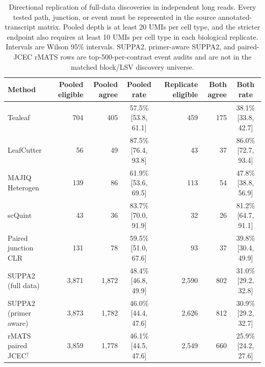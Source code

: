 \documentclass[11pt]{article}
\begin{document}
\begin{table}[H]
\centering
\scriptsize
\setlength{\tabcolsep}{3pt}
\caption{Directional replication of full-data discoveries in independent long reads. Every tested path, junction, or event must be represented in the source annotated-transcript matrix. Pooled depth is at least 20 UMIs per cell type, and the stricter endpoint also requires at least 10 UMIs per cell type in each biological replicate. Intervals are Wilson 95\% intervals. SUPPA2, primer-aware SUPPA2, and paired-JCEC rMATS rows are top-500-per-contrast event audits and are not in the matched block/LSV discovery universe.}
\label{tab:tilgner-method-replication}
\begin{tabular}{lrrcrrc}
\toprule
Method & Pooled eligible & Pooled agree & Pooled rate & Replicate eligible & Both agree & Both rate\\
\midrule
Tealeaf & 704 & 405 & 57.5\% [53.8, 61.1] & 459 & 175 & 38.1\% [33.8, 42.7]\\
LeafCutter & 56 & 49 & 87.5\% [76.4, 93.8] & 43 & 37 & 86.0\% [72.7, 93.4]\\
MAJIQ Heterogen & 139 & 86 & 61.9\% [53.6, 69.5] & 113 & 54 & 47.8\% [38.8, 56.9]\\
scQuint & 43 & 36 & 83.7\% [70.0, 91.9] & 32 & 26 & 81.2\% [64.7, 91.1]\\
Paired junction CLR & 131 & 78 & 59.5\% [51.0, 67.6] & 93 & 37 & 39.8\% [30.4, 49.9]\\
SUPPA2 (full data) & 3,871 & 1,872 & 48.4\% [46.8, 49.9] & 2,590 & 802 & 31.0\% [29.2, 32.8]\\
SUPPA2 (primer aware) & 3,873 & 1,782 & 46.0\% [44.4, 47.6] & 2,626 & 812 & 30.9\% [29.2, 32.7]\\
rMATS paired JCEC$^{\dagger}$ & 3,859 & 1,778 & 46.1\% [44.5, 47.6] & 2,549 & 660 & 25.9\% [24.2, 27.6]\\
\bottomrule
\end{tabular}
\end{table}
\end{document}
